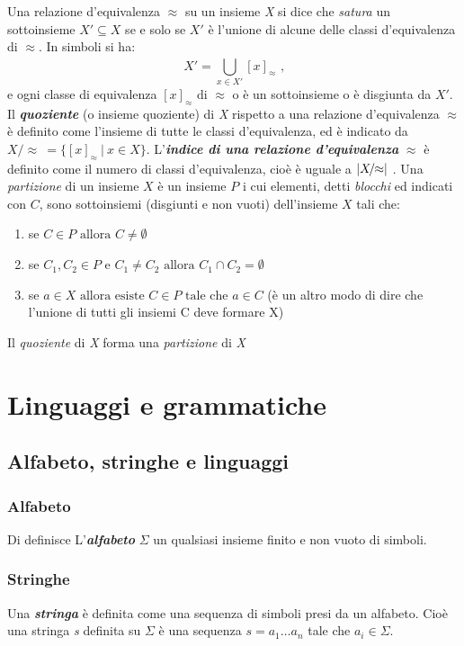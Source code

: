 Una relazione d'equivalenza $\approx$ su un insieme \textit{X} si dice che \textit{satura} un sottoinsieme $X' \subseteq X$ se e solo se $X'$ è l'unione di alcune delle classi d'equivalenza di $\approx$. In simboli si ha:
\begin{equation*}
X' = \bigcup_{x \in X'}^{}{\!\![x]_\approx} \text{ ,}
\end{equation*}
e ogni classe di equivalenza $[x]_\approx \text{ di } \approx$ o è un sottoinsieme o è disgiunta da $X'$.\\
Il \textbf{\textit{quoziente}} (o insieme quoziente) di \textit{X} rispetto a una relazione d'equivalenza $\approx$ è definito come l'insieme di tutte le classi d'equivalenza, ed è indicato da $X\!/\!\!\approx  \:=  \{[x]_\approx \: | \: x \in X \}$. L'\textbf{\textit{indice di una relazione d'equivalenza}} $\approx$ è definito come il numero di classi d'equivalenza, cioè è uguale a $\lvert X\!/\!\!\approx\rvert$ .
 Una \textit{partizione} di un insieme $X$ è un insieme $P$ i cui elementi, detti \textit{blocchi} ed indicati con $C$, sono sottoinsiemi (disgiunti e non vuoti) dell'insieme $X$ tali che: 
\begin{enumerate}
\item se $C \in P \text{ allora } C \ne \emptyset$
\item se $C_1,C_2 \in P \text{ e } C_1 \ne C_2 \text{ allora } C_1 \cap C_2  = \emptyset   $
\item se $a \in X \text{ allora esiste } C \in P \text{ tale che } a \in C$ (è un altro modo di dire che l'unione di tutti gli insiemi C deve formare X)
\end{enumerate}  
Il \textit{quoziente} di \textit{X} forma una \textit{partizione} di \textit{X}

\section{Linguaggi e grammatiche}
\subsection{Alfabeto, stringhe e linguaggi}
\subsubsection{Alfabeto}
Di definisce L'\textbf{\textit{alfabeto}} $\Sigma$ un qualsiasi insieme finito e non vuoto di simboli.

\subsubsection{Stringhe}
Una \textbf{\textit{stringa}} è definita come una sequenza di simboli presi da un alfabeto. Cioè una stringa \textit{s} definita su $\Sigma$ è una sequenza $ s = a_1\dots{}a_n$ tale che $a_i \in \Sigma$. 

